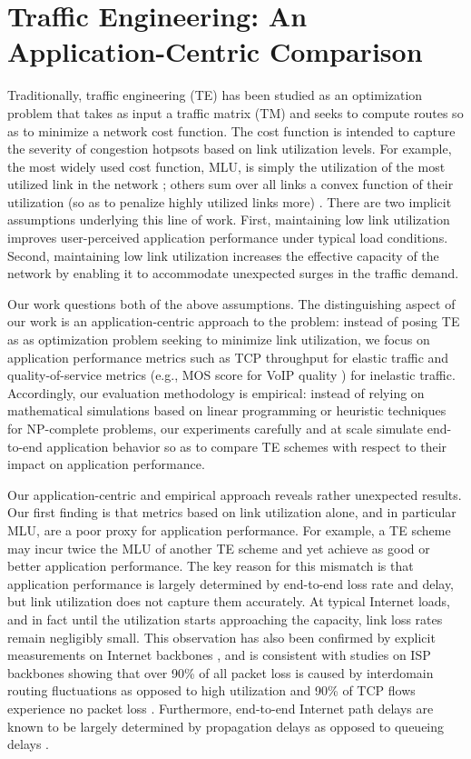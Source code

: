 \chapter{Traffic Engineering: An Application-Centric Comparison}
\label{ch:beyondmlu}
Traditionally, traffic engineering (TE) has been studied as an optimization problem that takes as input a traffic matrix (TM) and seeks to compute routes so as to minimize a network cost function. The cost function is intended to capture the severity of congestion hotpsots based on link utilization levels. For example, the most widely used cost function, MLU, is simply the utilization of the most utilized link in the network \cite{COPE,TEXCP,MultiTM,Cohen}; others  sum over all links a convex function of their utilization  (so as to penalize highly utilized links more)  \cite{fortz2000internet,fortz2002traffic}. There are two implicit assumptions underlying this line of work. First, maintaining low link utilization improves user-perceived application performance under typical load conditions. Second, maintaining low link utilization increases the effective capacity of the network by enabling it to accommodate unexpected surges in the traffic demand.


Our work questions both of the above assumptions. The distinguishing aspect of our work is an application-centric approach to the problem: instead of posing TE as as optimization problem seeking to minimize link utilization, we focus on application performance metrics such as TCP throughput for elastic  traffic and quality-of-service metrics (e.g., MOS score for VoIP quality \cite{MOS-formula}) for inelastic traffic. Accordingly, our evaluation methodology is empirical: instead of relying on mathematical simulations based on linear programming or heuristic techniques for NP-complete problems, our experiments carefully and at scale simulate end-to-end application behavior so as to compare TE schemes with respect to their impact on application performance. 

Our application-centric and empirical approach reveals rather unexpected results. Our first finding is that metrics based on link utilization alone, and in particular MLU, are a poor proxy for application performance. For example, a TE scheme may incur twice the MLU of another TE scheme and yet achieve as good or better application performance. The key reason for this mismatch is that application performance is largely determined by end-to-end loss rate and delay, but link utilization does not capture them accurately. At typical Internet loads, and in fact until the utilization starts approaching the capacity, link loss rates remain negligibly small. This observation has also been confirmed by explicit measurements on Internet backbones \cite{ExpRouterBuffer}, and is consistent with studies on ISP backbones showing that over 90\% of all packet loss is caused by interdomain routing fluctuations as opposed to high utilization \cite{SprintStudy} and 90\% of TCP flows experience no packet loss \cite{SprintBackbone}. Furthermore, end-to-end Internet path delays are known to be largely determined by propagation delays as opposed to queueing delays \cite{SprintBackbone,SingleHopDelay}. 

